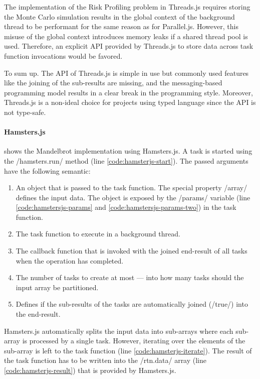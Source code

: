 The implementation of the Risk Profiling problem in Threads.js requires storing the Monte Carlo simulation results in the global context of the background thread to be performant for the same reason as for Parallel.js. However, this misuse of the global context introduces memory leaks if a shared thread pool is used. Therefore, an explicit API provided by Threads.js to store data across task function invocations would be favored.

To sum up. The API of Threads.js is simple in use but commonly used features like the joining of the sub-results are missing, and the messaging-based programming model results in a clear break in the programming style. Moreover, Threads.js is a non-ideal choice for projects using typed language since the API is not type-safe.

\paragraph{Hamsters.js}
 shows the Mandelbrot implementation using Hamsters.js. A task is started using the \javascriptinline/hamsters.run/ method (line \ref{code:hamsterjs-start}). The passed arguments have the following semantic:

\begin{enumerate}
	\item An object that is passed to the task function. The special property \javascriptinline/array/ defines the input data. The object is exposed by the \javascriptinline/params/ variable (line \ref{code:hamstersjs-params} and \ref{code:hamstersjs-params-two}) in the task function.
	\item The task function to execute in a background thread.
	\item The callback function that is invoked with the joined end-result of all tasks when the operation has completed.
	\item The number of tasks to create at most --- into how many tasks should the input array be partitioned. 
	\item Defines if the sub-results of the tasks are automatically joined (\javascriptinline/true/) into the end-result.
\end{enumerate}

Hamsters.js automatically splits the input data into sub-arrays where each sub-array is processed by a single task. However, iterating over the elements of the sub-array is left to the task function (line \ref{code:hamsterjs-iterate}). The result of the task function has to be written into the \javascriptinline/rtn.data/ array (line \ref{code:hamsterjs-result}) that is provided by Hamsters.js. 


